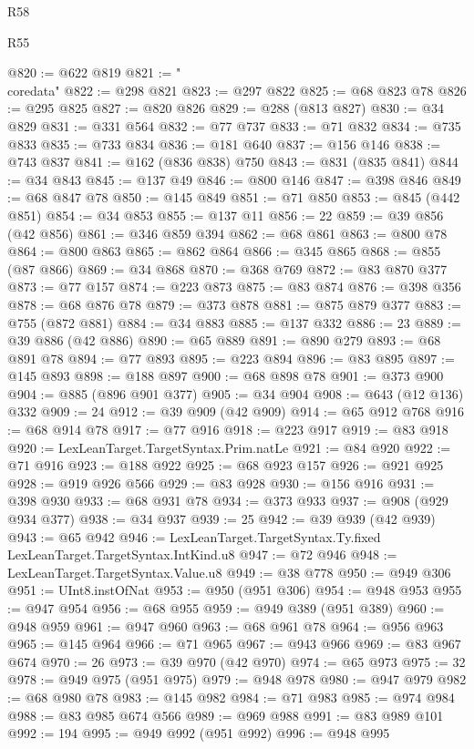\begin{lexlean}{R58}
\begin{lexlean}{R55}
\begin{coremodule}
{{{{{{{{{{{{{{{{{{{{{{{{{{{{{{{{{{{{{{{{{{{{{{{{{{{{{{{{{{{{{{@820 := @622 @819
@821 := "\\coredata"
@822 := @298 @821
@823 := @297 @822
@825 := @68 @823 @78
@826 := @295 @825
@827 := @820 @826
@829 := @288 (@813 @827)
@830 := @34 @829
@831 := @331 @564
@832 := @77 @737
@833 := @71 @832
@834 := @735 @833
@835 := @733 @834
@836 := @181 @640
@837 := @156 @146
@838 := @743 @837
@841 := @162 (@836 @838) @750
@843 := @831 (@835 @841)
@844 := @34 @843
@845 := @137 @49
@846 := @800 @146
@847 := @398 @846
@849 := @68 @847 @78
@850 := @145 @849
@851 := @71 @850
@853 := @845 (@442 @851)
@854 := @34 @853
@855 := @137 @11
@856 := 22
@859 := @39 @856 (@42 @856)
@861 := @346 @859 @394
@862 := @68 @861
@863 := @800 @78
@864 := @800 @863
@865 := @862 @864
@866 := @345 @865
@868 := @855 (@87 @866)
@869 := @34 @868
@870 := @368 @769
@872 := @83 @870 @377
@873 := @77 @157
@874 := @223 @873
@875 := @83 @874
@876 := @398 @356
@878 := @68 @876 @78
@879 := @373 @878
@881 := @875 @879 @377
@883 := @755 (@872 @881)
@884 := @34 @883
@885 := @137 @332
@886 := 23
@889 := @39 @886 (@42 @886)
@890 := @65 @889
@891 := @890 @279
@893 := @68 @891 @78
@894 := @77 @893
@895 := @223 @894
@896 := @83 @895
@897 := @145 @893
@898 := @188 @897
@900 := @68 @898 @78
@901 := @373 @900
@904 := @885 (@896 @901 @377)
@905 := @34 @904
@908 := @643 (@12 @136) @332
@909 := 24
@912 := @39 @909 (@42 @909)
@914 := @65 @912 @768
@916 := @68 @914 @78
@917 := @77 @916
@918 := @223 @917
@919 := @83 @918
@920 := LexLeanTarget.TargetSyntax.Prim.natLe
@921 := @84 @920
@922 := @71 @916
@923 := @188 @922
@925 := @68 @923 @157
@926 := @921 @925
@928 := @919 @926 @566
@929 := @83 @928
@930 := @156 @916
@931 := @398 @930
@933 := @68 @931 @78
@934 := @373 @933
@937 := @908 (@929 @934 @377)
@938 := @34 @937
@939 := 25
@942 := @39 @939 (@42 @939)
@943 := @65 @942
@946 := LexLeanTarget.TargetSyntax.Ty.fixed LexLeanTarget.TargetSyntax.IntKind.u8
@947 := @72 @946
@948 := LexLeanTarget.TargetSyntax.Value.u8
@949 := @38 @778
@950 := @949 @306
@951 := UInt8.instOfNat
@953 := @950 (@951 @306)
@954 := @948 @953
@955 := @947 @954
@956 := @68 @955
@959 := @949 @389 (@951 @389)
@960 := @948 @959
@961 := @947 @960
@963 := @68 @961 @78
@964 := @956 @963
@965 := @145 @964
@966 := @71 @965
@967 := @943 @966
@969 := @83 @967 @674
@970 := 26
@973 := @39 @970 (@42 @970)
@974 := @65 @973
@975 := 32
@978 := @949 @975 (@951 @975)
@979 := @948 @978
@980 := @947 @979
@982 := @68 @980 @78
@983 := @145 @982
@984 := @71 @983
@985 := @974 @984
@988 := @83 @985 @674 @566
@989 := @969 @988
@991 := @83 @989 @101
@992 := 194
@995 := @949 @992 (@951 @992)
@996 := @948 @995
}}}}}}}}}}}}}}}}}}}}}}}}}}}}}}}}}}}}}}}}}}}}}}}}}}}}}}}}}}}}}}
\end{coremodule}
\end{lexlean}
\end{lexlean}
